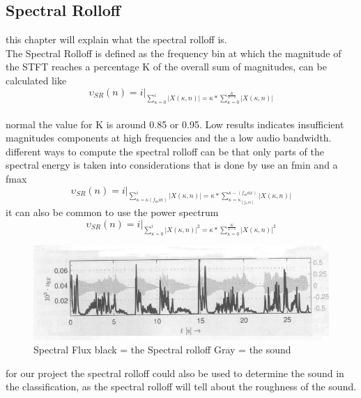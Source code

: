\subsection{Spectral Rolloff}
this chapter will explain what the spectral rolloff is.\\
The Spectral Rolloff is defined as the frequency bin at which the magnitude of the STFT reaches a percentage K of the overall sum of magnitudes, can be calculated like\citep{ACA}\\
\begin{equation}\label{ eq:normal spectral rolloff}
	\upsilon_{SR}(n) = i \vert _{\displaystyle\sum_{\kappa = 0}^i \vert X(\kappa, n) \vert = \kappa * \displaystyle\sum_{\kappa = 0}^ {\frac{K}{2-1}}\vert X(\kappa, n) \vert}
\end{equation}
\\
normal the value for K is around 0.85 or 0.95. Low results indicates insufficient magnitudes components at high frequencies and the a low audio bandwidth\citep{ACA}.\\
different ways to compute the spectral rolloff can be that only parts of the spectral energy is taken into considerations that is done by use an fmin and a fmax\citep{ACA}
\begin{equation}\label{ eq: fmin and fmax spectral rolloff}
	\upsilon_{SR}(n) = i \vert _{\displaystyle\sum_{\kappa = \kappa(f_min)}^i \vert X(\kappa, n) \vert = \kappa * \displaystyle\sum_{\kappa = \kappa_(f_min)}^ {\kappa-(f_max)}\vert X(\kappa, n) \vert}
\end{equation}
it can also be common to use the power spectrum
\begin{equation}\label{ eq:power spectral rolloff}
	\upsilon_{SR}(n) = i \vert _{\displaystyle\sum_{\kappa = 0}^i \vert X(\kappa, n) \vert^2 = \kappa * \displaystyle\sum_{\kappa = 0}^ {\frac{K}{2-1}}\vert X(\kappa, n) \vert^2}
\end{equation}
\begin{figure}[h]
	\begin{center}
		\includegraphics[scale = 0.5]{fig/spectral_rolloff.jpg}
		\caption{Spectral Flux black = the Spectral rolloff Gray = the sound}
		\label{Spectral rolloff pic}
	\end{center}
\end{figure}
for our project the spectral rolloff could also be used to determine the sound in the classification, as the spectral rolloff will tell about the roughness of the sound. 

